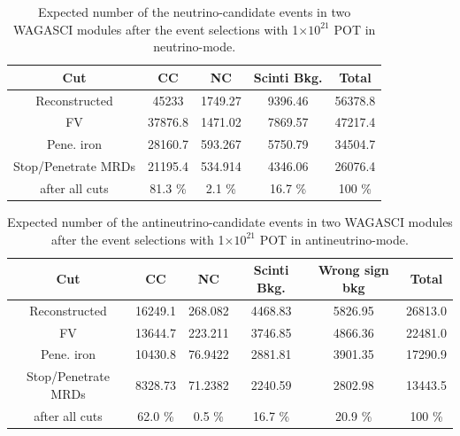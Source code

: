 \begin{table}[htb]
  \begin{center}
    \caption{Expected number of the neutrino-candidate events in two WAGASCI modules after the event selections with 1$\times 10^{21}$ POT in neutrino-mode.}
    \begin{tabular}{c|ccc|c} \hline
Cut   & CC & NC & Scinti Bkg. & Total \\ \hline
Reconstructed & 45233 & 1749.27 & 9396.46 & 56378.8 \\
FV & 37876.8 & 1471.02 & 7869.57 & 47217.4 \\
Pene. iron & 28160.7 & 593.267 & 5750.79 & 34504.7 \\
Stop/Penetrate MRDs & 21195.4 & 534.914 & 4346.06 & 26076.4 \\ \hline
after all cuts & 81.3 \% & 2.1 \% & 16.7 \% & 100 \% \\
\hline
    \end{tabular}
    \label{tab:expected_num_events_neutrino_beam}
  \end{center}
\end{table}

\begin{table}[htb]
  \begin{center}
    \caption{Expected number of the antineutrino-candidate events in two WAGASCI modules after the event selections with 1$\times 10^{21}$ POT in antineutrino-mode.}
    \begin{tabular}{c|cccc|c} \hline
 Cut   & CC & NC & Scinti Bkg. & Wrong sign bkg & Total \\ \hline
Reconstructed & 16249.1 & 268.082 & 4468.83 & 5826.95 & 26813.0 \\ 
FV & 13644.7 & 223.211 & 3746.85 & 4866.36 & 22481.0 \\ 
Pene. iron & 10430.8 & 76.9422 & 2881.81 & 3901.35 & 17290.9 \\ 
Stop/Penetrate MRDs & 8328.73 & 71.2382 & 2240.59 & 2802.98 & 13443.5 \\ \hline
after all cuts & 62.0 \% & 0.5 \% & 16.7 \% &  20.9 \% & 100 \% \\
\hline
    \end{tabular}
    \label{tab:expected_num_events_antineutrino_beam}
  \end{center}
\end{table}

